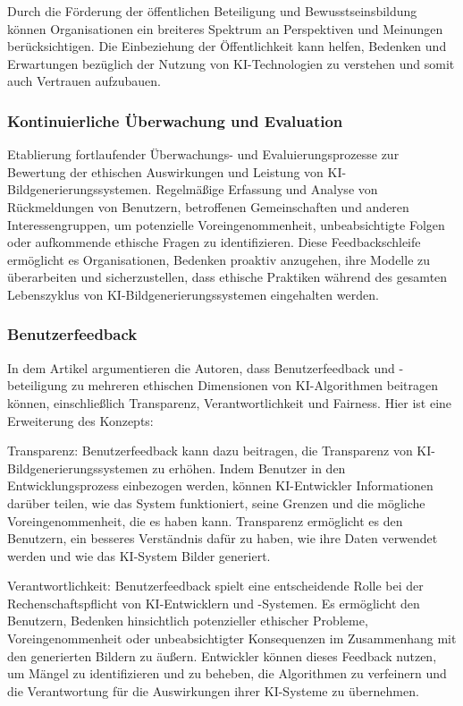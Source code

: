 \documentclass[12pt]{article}
\begin{document}
Durch die Förderung der öffentlichen Beteiligung und Bewusstseinsbildung können Organisationen ein breiteres Spektrum an Perspektiven und Meinungen berücksichtigen. Die Einbeziehung der Öffentlichkeit kann helfen, Bedenken und Erwartungen bezüglich der Nutzung von KI-Technologien zu verstehen und somit auch Vertrauen aufzubauen.
\cite{Zytko}
\subsubsection{Kontinuierliche Überwachung und Evaluation}
Etablierung fortlaufender Überwachungs- und Evaluierungsprozesse zur Bewertung der ethischen Auswirkungen und Leistung von KI-Bildgenerierungssystemen. Regelmäßige Erfassung und Analyse von Rückmeldungen von Benutzern, betroffenen Gemeinschaften und anderen Interessengruppen, um potenzielle Voreingenommenheit, unbeabsichtigte Folgen oder aufkommende ethische Fragen zu identifizieren. Diese Feedbackschleife ermöglicht es Organisationen, Bedenken proaktiv anzugehen, ihre Modelle zu überarbeiten und sicherzustellen, dass ethische Praktiken während des gesamten Lebenszyklus von KI-Bildgenerierungssystemen eingehalten werden.
\cite{WILSON2022101652}
\subsubsection{Benutzerfeedback}
In dem Artikel \cite{Mittelstadt} argumentieren die Autoren, dass Benutzerfeedback und -beteiligung zu mehreren ethischen Dimensionen von KI-Algorithmen beitragen können, einschließlich Transparenz, Verantwortlichkeit und Fairness. Hier ist eine Erweiterung des Konzepts:

Transparenz: Benutzerfeedback kann dazu beitragen, die Transparenz von KI-Bildgenerierungssystemen zu erhöhen. Indem Benutzer in den Entwicklungsprozess einbezogen werden, können KI-Entwickler Informationen darüber teilen, wie das System funktioniert, seine Grenzen und die mögliche Voreingenommenheit, die es haben kann. Transparenz ermöglicht es den Benutzern, ein besseres Verständnis dafür zu haben, wie ihre Daten verwendet werden und wie das KI-System Bilder generiert.

Verantwortlichkeit: Benutzerfeedback spielt eine entscheidende Rolle bei der Rechenschaftspflicht von KI-Entwicklern und -Systemen. Es ermöglicht den Benutzern, Bedenken hinsichtlich potenzieller ethischer Probleme, Voreingenommenheit oder unbeabsichtigter Konsequenzen im Zusammenhang mit den generierten Bildern zu äußern. Entwickler können dieses Feedback nutzen, um Mängel zu identifizieren und zu beheben, die Algorithmen zu verfeinern und die Verantwortung für die Auswirkungen ihrer KI-Systeme zu übernehmen.
\end{document}
